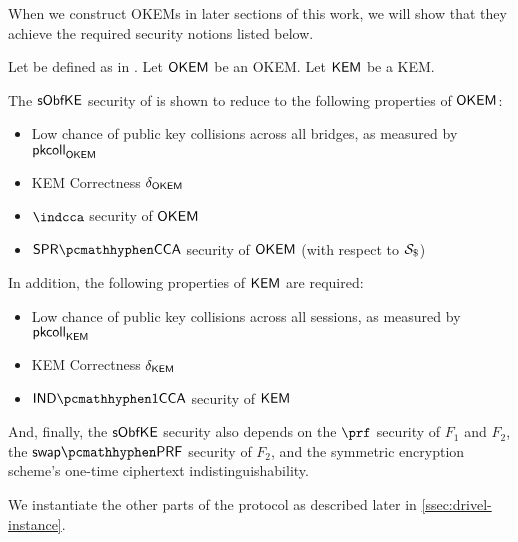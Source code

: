 When we construct OKEMs in later sections of this work, we will show that they achieve the required security notions listed below.

\begin{theorem}
\label{thm:drivel-security}
    Let \drivel{} be defined as in \cite[Fig.~6]{EPRINT:GRSV25}. Let $\mathsf{OKEM}$ be an OKEM. Let $\mathsf{KEM}$ be a KEM.
    
    The $\mathsf{sObfKE}$ security of \drivel{} is shown to reduce to the following properties of $\mathsf{OKEM}$:
    \begin{itemize}
        \item Low chance of public key collisions across all bridges, as measured by $\mathsf{pkcoll}_{\mathsf{OKEM}}$
        \item KEM Correctness $\delta_{\mathsf{OKEM}}$
        \item $\indcca$ security of $\mathsf{OKEM}$
        \item $\sprcca$ security of $\mathsf{OKEM}$ (with respect to $\simulbin$)
    \end{itemize}

    In addition, the following properties of $\mathsf{KEM}$ are required:
    \begin{itemize}
        \item Low chance of public key collisions across all sessions, as measured by $\mathsf{pkcoll}_{\mathsf{KEM}}$
        \item KEM Correctness $\delta_{\mathsf{KEM}}$
        \item $\indonecca$ security of $\mathsf{KEM}$
    \end{itemize}

    And, finally, the $\mathsf{sObfKE}$ security also depends on the $\prf$ security of $F_1$ and $F_2$, the $\swapprf$ security of $F_2$, and the symmetric encryption scheme's one-time ciphertext indistinguishability.    
\end{theorem}

We instantiate the other parts of the \drivel{} protocol as described later in \cref{ssec:drivel-instance}.

